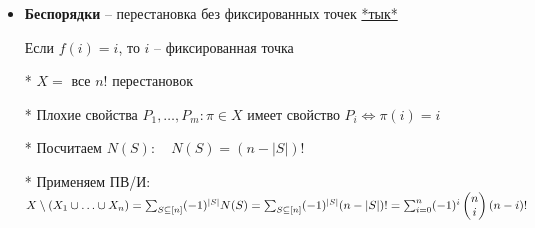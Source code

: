 \documentclass[12pt]{article}
\begin{document}
\begin{itemize}
        \item \textbf{Беспорядки} -- перестановка без фиксированных точек
        \hfill\href{https://ru.wikipedia.org/wiki/%D0%91%D0%B5%D1%81%D0%BF%D0%BE%D1%80%D1%8F%D0%B4%D0%BE%D0%BA_(%D0%BF%D0%B5%D1%80%D0%B5%D1%81%D1%82%D0%B0%D0%BD%D0%BE%D0%B2%D0%BA%D0%B0)}{*тык*}

        Если $f(i) = i$, то $i$ -- фиксированная точка

        * $X = $ все $n!$ перестановок

        * Плохие свойства $P_1,\dots,P_m : \pi \in X$ имеет свойство $P_i \Longleftrightarrow \pi(i) = i$

        * Посчитаем $N(S): \quad N(S) = (n - |S|)!$

        * Применяем ПВ/И: $X \setminus (X_1 \union \dots \union X_n) = \sum_{S \subseteq [n]} (-1)^{|S|} N(S) =
        \sum_{S \subseteq [n]} (-1)^{|S|} (n - |S|)! = \sum_{i = 0}^n (-1)^{i} \begin{pmatrix}
                                                                                   n \\ i
        \end{pmatrix} (n - i)!$

    \end{itemize}
\end{document}
